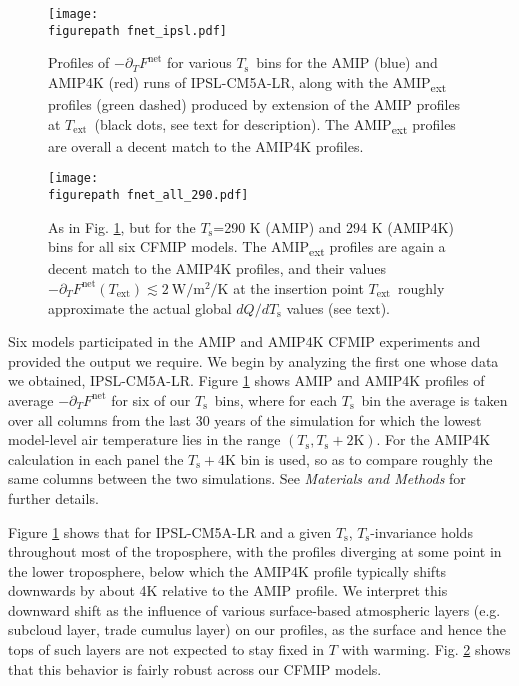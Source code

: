 \documentclass[9pt,twocolumn,twoside,lineno]{pnas-new}
\newcommand{\ppt}{\ensuremath{\partial_T}}
\newcommand{\Fnet}{\ensuremath{F^\mathrm{net}}}
\newcommand{\WmsqK}{\ensuremath{\mathrm{W/m^2/K}}}
\newcommand{\Kelvin}{\ensuremath{\mathrm{K}}}
\newcommand{\Ts}{\ensuremath{T_\mathrm{s}}}
\newcommand{\Text}{\ensuremath{T_\mathrm{ext}}}
\newcommand{\figurepath}{./}
\begin{document}
\begin{figure}[t]
	\begin{center}
			\texttt{[image: \\figurepath fnet\_ipsl.pdf]}
		\caption{ Profiles of $-\ppt \Fnet$ for various \Ts\ bins for the AMIP (blue) and AMIP4K (red) runs of IPSL-CM5A-LR, along with the AMIP\textsubscript{ext} profiles (green dashed) produced by extension of the AMIP profiles at \Text\ (black dots, see text for description). The AMIP\textsubscript{ext} profiles are overall a decent match to the AMIP4K profiles.
		\label{fnet_ipsl}
		}
	\end{center}
\end{figure}


\begin{figure}[t]
	\begin{center}
			\texttt{[image: \\figurepath fnet\_all\_290.pdf]}
		\caption{ As in Fig. \ref{fnet_ipsl}, but for the \Ts=290 K (AMIP) and 294 K (AMIP4K) bins for all six CFMIP models. The AMIP\textsubscript{ext} profiles are again a decent match to the AMIP4K profiles, and their values $-\ppt\Fnet(\Text)\lesssim 2\ \WmsqK$ at the insertion point \Text\ roughly approximate the actual  global $dQ/d\Ts$  values (see text).
		\label{fnet_all}
		}
	\end{center}
\end{figure}

Six models participated in the AMIP and AMIP4K CFMIP experiments and provided the output we require. We begin by analyzing the first one whose data we obtained, IPSL-CM5A-LR. Figure \ref{fnet_ipsl} shows AMIP and AMIP4K  profiles of average $-\ppt \Fnet$ for six of our \Ts\ bins, where for each \Ts\ bin the average is taken over  all columns from the last 30 years of the simulation for which the lowest model-level air temperature lies in the range $(\Ts,\Ts +2\Kelvin)$. For the AMIP4K calculation in each panel the $\Ts +4\Kelvin$ bin is used, so as to compare roughly the same columns between the two simulations.  See \emph{Materials and Methods} for further details.

 Figure \ref{fnet_ipsl} shows that for IPSL-CM5A-LR and a given \Ts, \Ts-invariance holds throughout most of the troposphere, 
 with the profiles diverging at some point in the lower troposphere, below which the AMIP4K profile typically shifts downwards by about 4K relative to the AMIP profile. We interpret this downward shift  as the influence of various surface-based atmospheric layers (e.g. subcloud layer, trade cumulus layer) on our profiles, as the surface and hence the tops of such layers are not expected to stay fixed in $T$ with warming. Fig. \ref{fnet_all} shows that this behavior is fairly robust across our CFMIP models.
\end{document}

